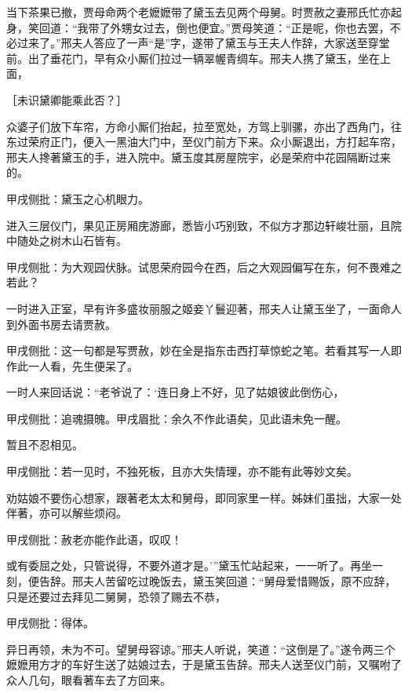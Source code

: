 \begin{parag}
    当下茶果已撤，贾母命两个老嬷嬷带了黛玉去见两个母舅。时贾赦之妻邢氏忙亦起身，笑回道：“我带了外甥女过去，倒也便宜。”贾母笑道：“正是呢，你也去罢，不必过来了。”邢夫人答应了一声“是”字，遂带了黛玉与王夫人作辞，大家送至穿堂前。出了垂花门，早有众小厮们拉过一辆翠幄青绸车。邢夫人携了黛玉，坐在上面，\begin{note}［未识黛卿能乘此否？］\end{note}众婆子们放下车帘，方命小厮们抬起，拉至宽处，方驾上驯骡，亦出了西角门，往东过荣府正门，便入一黑油大门中，至仪门前方下来。众小厮退出，方打起车帘，邢夫人搀著黛玉的手，进入院中。黛玉度其房屋院宇，必是荣府中花园隔断过来的。\begin{note}甲戌侧批：黛玉之心机眼力。\end{note}进入三层仪门，果见正房厢庑游廊，悉皆小巧别致，不似方才那边轩峻壮丽，且院中随处之树木山石皆有。\begin{note}甲戌侧批：为大观园伏脉。试思荣府园今在西，后之大观园偏写在东，何不畏难之若此？\end{note}一时进入正室，早有许多盛妆丽服之姬妾丫鬟迎著，邢夫人让黛玉坐了，一面命人到外面书房去请贾赦。\begin{note}甲戌侧批：这一句都是写贾赦，妙在全是指东击西打草惊蛇之笔。若看其写一人即作此一人看，先生便呆了。\end{note}一时人来回话说：“老爷说了：‘连日身上不好，见了姑娘彼此倒伤心，\begin{note}甲戌侧批：追魂摄魄。甲戌眉批：余久不作此语矣，见此语未免一醒。\end{note}暂且不忍相见。\begin{note}甲戌侧批：若一见时，不独死板，且亦大失情理，亦不能有此等妙文矣。\end{note}劝姑娘不要伤心想家，跟著老太太和舅母，即同家里一样。姊妹们虽拙，大家一处伴著，亦可以解些烦闷。\begin{note}甲戌侧批：赦老亦能作此语，叹叹！\end{note}或有委屈之处，只管说得，不要外道才是。’”黛玉忙站起来，一一听了。再坐一刻，便告辞。邢夫人苦留吃过晚饭去，黛玉笑回道：“舅母爱惜赐饭，原不应辞，只是还要过去拜见二舅舅，恐领了赐去不恭，\begin{note}甲戌侧批：得体。\end{note}异日再领，未为不可。望舅母容谅。”邢夫人听说，笑道：“这倒是了。”遂令两三个嬷嬷用方才的车好生送了姑娘过去，于是黛玉告辞。邢夫人送至仪门前，又嘱咐了众人几句，眼看著车去了方回来。
\end{parag}


